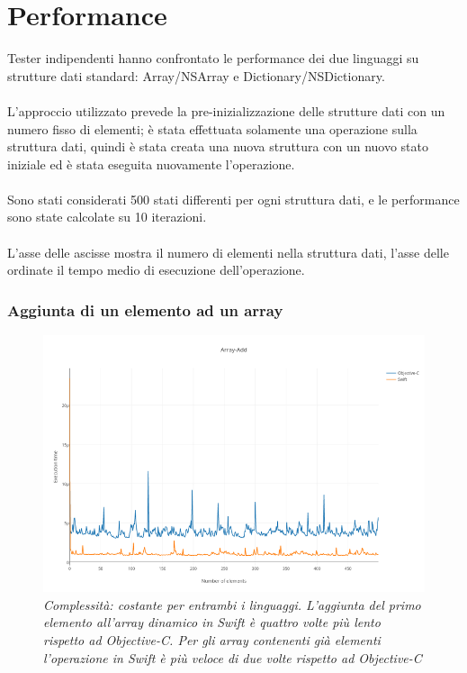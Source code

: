 \section{Performance}
Tester indipendenti hanno confrontato le performance dei due linguaggi su strutture dati standard: Array/NSArray e Dictionary/NSDictionary.\\\\
L'approccio utilizzato prevede la pre-inizializzazione delle strutture dati con un numero fisso di elementi; è stata effettuata solamente una operazione sulla struttura dati, quindi è stata creata una nuova struttura con un nuovo stato iniziale ed è stata eseguita nuovamente l'operazione.\\\\ Sono stati considerati 500 stati differenti per ogni struttura dati, e le performance sono state calcolate su 10 iterazioni.\\\\L'asse delle ascisse mostra il numero di elementi nella struttura dati, l'asse delle ordinate il tempo medio di esecuzione dell'operazione.
\subsubsection{Aggiunta di un elemento ad un array}
\begin{figure}[H]
      \centering
      \includegraphics[scale=0.50]{immagini/array_add.png}
            \vspace{0.8cm}
            \caption{\textit{Complessità: costante per entrambi i linguaggi. L'aggiunta del primo elemento all'array dinamico in Swift è quattro volte più lento rispetto ad Objective-C.
Per gli array contenenti già elementi l'operazione in Swift è più veloce di due volte rispetto ad Objective-C}}
\end{figure}
